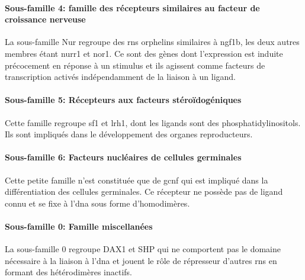 \documentclass[../main.tex]{subfiles}
\begin{document}
			\paragraph{Sous-famille 4: famille des récepteurs similaires au facteur de croissance nerveuse}
				La sous-famille Nur regroupe des \glspl{rn} orphelins similaires à \gls{ngf1b}, les deux autres membres étant \gls{nurr1} et \gls{nor1}.
				Ce sont des gènes dont l'expression est induite précocement en réponse à un stimulus et ils agissent comme facteurs de transcription activés indépendamment de la liaison à un ligand.

			\paragraph{Sous-famille 5: Récepteurs aux facteurs stéroïdogéniques}
				Cette famille regroupe \gls{sf1} et \gls{lrh1}, dont les ligands sont des phosphatidylinositols.
				Ils sont impliqués dans le développement des organes reproducteurs.

			\paragraph{Sous-famille 6: Facteurs nucléaires de cellules germinales}
				Cette petite famille n'est constituée que de \gls{gcnf} qui est impliqué dans la différentiation des cellules germinales.
				Ce récepteur ne possède pas de ligand connu et se fixe à l'\gls{dna} sous forme d'homodimères.

			\paragraph{Sous-famille 0: Famille miscellanées}
				La sous-famille 0 regroupe DAX1 et SHP qui ne comportent pas le domaine nécessaire à la liaison à l'\gls{dna} et jouent le rôle de répresseur d'autres \glspl{rn} en formant des hétérodimères inactifs.
\end{document}
